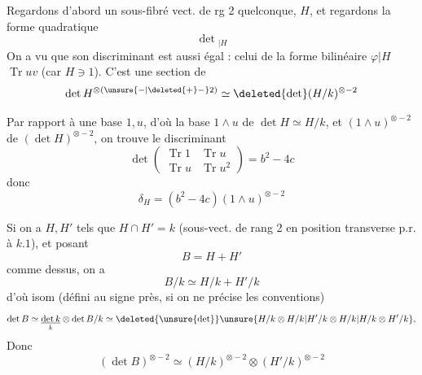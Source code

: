 Regardons d'abord un sous-fibré vect. de rg 2 quelconque, $H$, et regardons  la forme  quadratique
\[
\det{}_{|H}
\]
On a vu que son discriminant  est aussi égal : celui de la forme bilinéaire  $\varphi|H$ $\operatorname{Tr}uv$ (car $H\ni1$). C'est une section de
\[
\det H^{\otimes(\unsure{-|{\deleted{+}}-}2)}\simeq\deleted{\det}(H/k)^{\otimes-2}
\]

Par rapport à une base $1,u$, d'où la base $1\wedge u$ de $\det H\simeq H/k$, et $(1\wedge u)^{\otimes-2}$ de $(\det H)^{\otimes-2}$, on trouve le discriminant
\[
\det\begin{pmatrix}\operatorname{Tr}1&\operatorname{Tr}u\\\operatorname{Tr}u&\operatorname{Tr}u^2\end{pmatrix}=b^2-4c
\]
donc
\[
\delta_H=(b^2-4c)(1\wedge u)^{\otimes-2}
\]

Si on a $H,H'$ tels que $H\cap H'=k$ (sous-vect. de rang 2 en position transverse p.r. à $k.1$), et posant
\[
B=H+H'
\]
comme dessus, on a
\[
B/k\simeq H/k+H'/k
\]
d'où isom (défini au signe près, si on ne précise les conventions)
\[
\det B\simeq\underset{k}{\underline{\det k}}\otimes\det B/k\simeq \deleted{\unsure{\det}}\unsure{H/k\otimes H/k|H'/k\otimes H/k|H/k\otimes H'/k},
\]
Donc 
\[
(\det B)^{\otimes-2}\simeq(H/k)^{\otimes-2}\otimes(H'/k)^{\otimes-2}
\]
